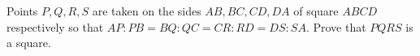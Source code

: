 Points $P,Q,R,S$ are taken on the sides $AB,BC,CD,DA$ of square $ABCD$ respectively so that $AP:PB=BQ:QC=CR:RD=DS:SA$. Prove that $PQRS$ is a square.
